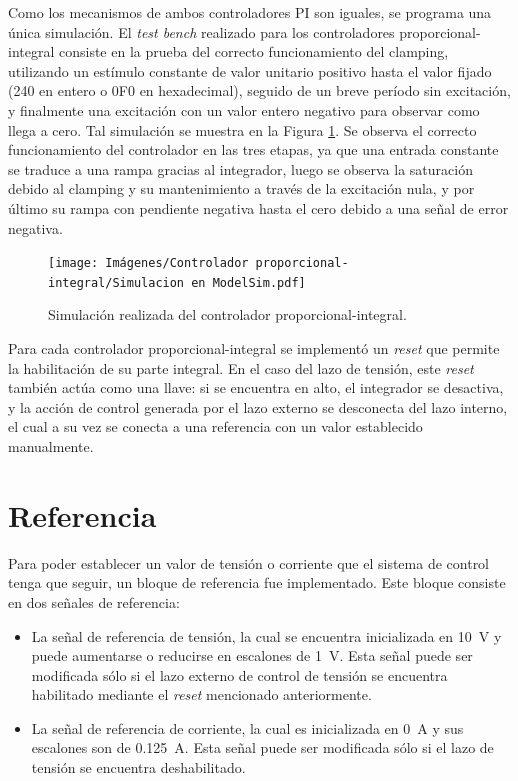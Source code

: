 Como los mecanismos de ambos controladores PI son iguales, se programa una única simulación. El \emph{test bench} realizado para los controladores proporcional-integral consiste en la prueba del correcto funcionamiento del clamping, utilizando un estímulo constante de valor unitario positivo hasta el valor fijado (240 en entero o 0F0 en hexadecimal), seguido de un breve período sin excitación, y finalmente una excitación con un valor entero negativo para observar como llega a cero. Tal simulación se muestra en la Figura \ref{simulacion-pi}. Se observa el correcto funcionamiento del controlador en las tres etapas, ya que una entrada constante se traduce a una rampa gracias al integrador, luego se observa la saturación debido al clamping y su mantenimiento a través de la excitación nula, y por último su rampa con pendiente negativa hasta el cero debido a una señal de error negativa.

\begin{figure}[hbt!]
    \centering
    \texttt{[image: Imágenes/Controlador proporcional-integral/Simulacion en ModelSim.pdf]}    
    \caption{Simulación realizada del controlador proporcional-integral.}
    \label{simulacion-pi}
\end{figure} 

Para cada controlador proporcional-integral se implementó un \emph{reset} que permite la habilitación de su parte integral. En el caso del lazo de tensión, este \emph{reset} también actúa como una llave: si se encuentra en alto, el integrador se desactiva, y la acción de control generada por el lazo externo se desconecta del lazo interno, el cual a su vez se conecta a una referencia con un valor establecido manualmente.

\section{Referencia}

Para poder establecer un valor de tensión o corriente que el sistema de control tenga que seguir, un bloque de referencia fue implementado. Este bloque consiste en dos señales de referencia: 

\begin{itemize}
    \item La señal de referencia de tensión, la cual se encuentra inicializada en \SI{10}{\volt} y puede aumentarse o reducirse en escalones de \SI{1}{\volt}. Esta señal puede ser modificada sólo si el lazo externo de control de tensión se encuentra habilitado mediante el \emph{reset} mencionado anteriormente.
    \item La señal de referencia de corriente, la cual es inicializada en \SI{0}{\ampere} y sus escalones son de \SI{0.125}{\ampere}. Esta señal puede ser modificada sólo si el lazo de tensión se encuentra deshabilitado.
\end{itemize}

